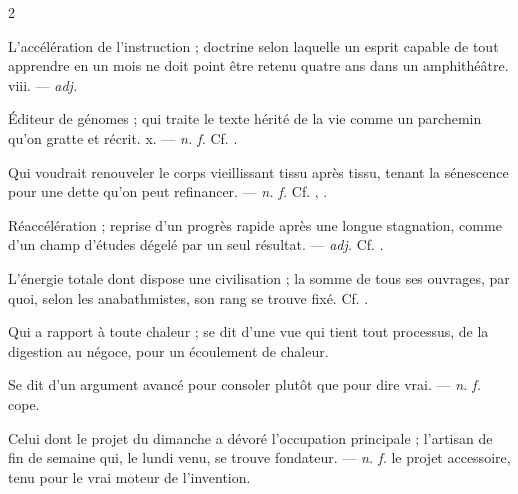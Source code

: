\begin{multicols}{2}

 L'accélération de l'instruction ; doctrine selon laquelle un esprit capable de tout apprendre en un mois ne doit point être retenu quatre ans dans un amphithéâtre.   viii. —  \textit{adj.}

 Éditeur de génomes ; qui traite le texte hérité de la vie comme un parchemin qu'on gratte et récrit.   x. —  \textit{n. f.} Cf. .

 Qui voudrait renouveler le corps vieillissant tissu après tissu, tenant la sénescence pour une dette qu'on peut refinancer. —  \textit{n. f.} Cf. , .

 Réaccélération ; reprise d'un progrès rapide après une longue stagnation, comme d'un champ d'études dégelé par un seul résultat.   —  \textit{adj.} Cf. .

 L'énergie totale dont dispose une civilisation ; la somme de tous ses ouvrages, par quoi, selon les anabathmistes, son rang se trouve fixé. Cf. .

 Qui a rapport à toute chaleur ; se dit d'une vue qui tient tout processus, de la digestion au négoce, pour un écoulement de chaleur.

 Se dit d'un argument avancé pour consoler plutôt que pour dire vrai. —  \textit{n. f.}  cope. 

 Celui dont le projet du dimanche a dévoré l'occupation principale ; l'artisan de fin de semaine qui, le lundi venu, se trouve fondateur. —  \textit{n. f.} le projet accessoire, tenu pour le vrai moteur de l'invention.


\end{multicols}

